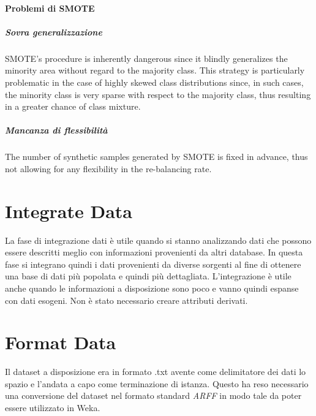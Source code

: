 \paragraph*{Problemi di SMOTE}
\subparagraph*{Sovra generalizzazione}
SMOTE’s procedure is inherently dangerous since it blindly generalizes the minority area without regard to the majority class.
This strategy is particularly problematic in the case of highly skewed class distributions since, in such cases, the minority class is very sparse with respect to the majority class, thus resulting in a greater chance of class mixture.


\subparagraph*{Mancanza di flessibilità}
The number of synthetic samples generated by SMOTE is fixed in advance, thus not allowing for any flexibility in the re-balancing rate.


\section{Integrate Data}
La fase di integrazione dati è utile quando si stanno analizzando dati che possono essere descritti meglio con informazioni provenienti da altri database. In questa fase si integrano quindi i dati provenienti da diverse sorgenti al fine di ottenere una base di dati più popolata e quindi più dettagliata. L'integrazione è utile anche quando le informazioni a disposizione sono poco e vanno quindi espanse con dati esogeni.
Non è stato necessario creare attributi derivati.

\section{Format Data}
Il dataset a disposizione era in formato .txt avente come delimitatore dei dati lo spazio e l'andata a capo come terminazione di istanza. Questo ha reso necessario una conversione del dataset nel formato standard \textit{ARFF} in modo tale da poter essere utilizzato in Weka.
